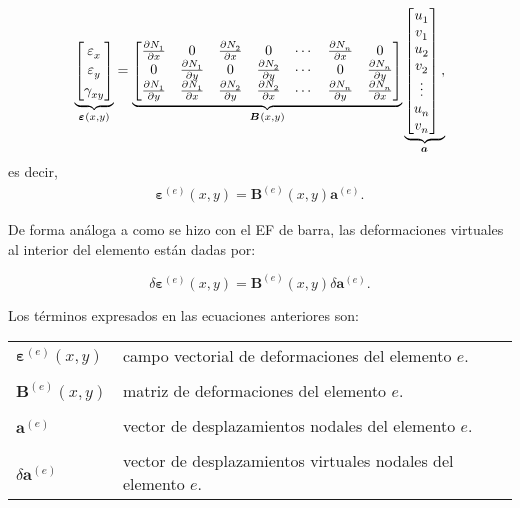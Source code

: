 \documentclass[12pt,letterpaper, landscape]{article}
\newcommand{\e}{{}}
\newcommand{\ve}[1]{{\boldsymbol{#1}}}
\newcommand{\ma}[1]{{\boldsymbol{#1}}}
\begin{document}
\begin{align}
\underbrace{\begin{bmatrix}
  \vphantom{\frac{\partial N_1^\e}{\partial x}} \varepsilon^\e_x \\
  \vphantom{\frac{\partial N_1^\e}{\partial y}} \varepsilon^\e_y \\
  \vphantom{\frac{\partial N_1^\e}{\partial y}} \gamma^\e_{xy}
\end{bmatrix}}_{\ve{\varepsilon}^\e(x,y)}=
\underbrace{\begin{bmatrix}
  \frac{\partial N_1^\e}{\partial x} & 0                                  & \frac{\partial N_2^\e}{\partial x} & 0 & \cdots & \frac{\partial N_n^\e}{\partial x} & 0 \\
   0                                 & \frac{\partial N_1^\e}{\partial y} & 0                                  & \frac{\partial N_2^\e}{\partial y} & \cdots & 0 & \frac{\partial N_n^\e}{\partial y}  \\
  \frac{\partial N_1^\e}{\partial y} & \frac{\partial N_1^\e}{\partial x} & \frac{\partial N_2^\e}{\partial y} & \frac{\partial N_2^\e}{\partial x} & \cdots &
\frac{\partial N_n^\e}{\partial y}   & \frac{\partial N_n^\e}{\partial x}
   \end{bmatrix}}_{\ma{B}^\e(x,y)} 
\underbrace{\begin{bmatrix}
   u_1^\e \\ v_1^\e \\ u_2^\e \\ v_2^\e \\ \vdots \\ u_n^\e \\ v_n^\e 
   \end{bmatrix},}_{\ma{a}^\e}
\end{align}
es decir,
\begin{align}
 \ve{\varepsilon}^{(e)}(x,y) = \ma{B}^{(e)}(x,y)  \ve{a}^{(e)}.
\end{align}

De forma análoga a como se hizo con el EF de barra, las deformaciones virtuales al interior del elemento están dadas por:

\begin{equation}
\delta \ve{\varepsilon}^{(e)}(x,y) = \ma{B}^{(e)}(x,y)  \delta  \ve{a}^{(e)}. \label{eq:delta_varepsilon}
\end{equation}

Los términos expresados en las ecuaciones anteriores son: 

\begin{tabular}{ll}
   $\ve{\varepsilon}^{(e)}(x,y)$     & campo vectorial de deformaciones del elemento $e$.\\
   \\[-1ex]
   $\ma{B}^{(e)}(x,y)$  & {matriz de deformaciones del elemento} $e$.\\
   \\[-1ex]
   $\ve{a}^{(e)}$       & {vector de desplazamientos nodales del elemento} $e$. \\
   \\[-1ex]
   $\delta\ve{a}^{(e)}$ & {vector de desplazamientos virtuales nodales del elemento} $e$.
\end{tabular} 
\end{document}
